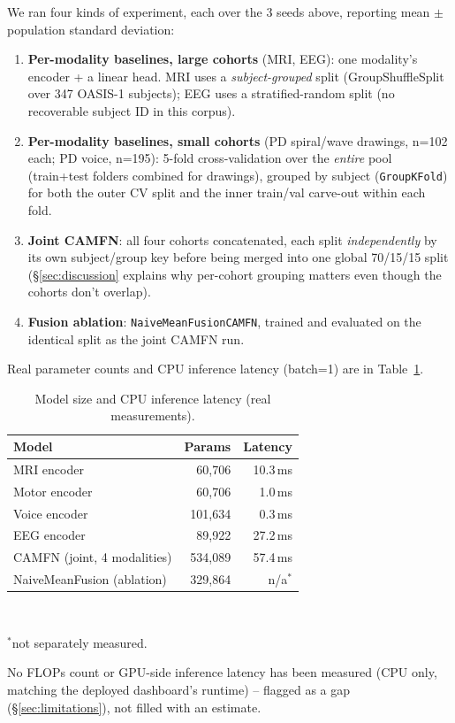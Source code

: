 \documentclass[conference]{IEEEtran}
\begin{document}
We ran four kinds of experiment, each over the 3 seeds above, reporting
mean $\pm$ population standard deviation:
\begin{enumerate}
\item \textbf{Per-modality baselines, large cohorts} (MRI, EEG): one
modality's encoder + a linear head. MRI uses a \emph{subject-grouped}
split (GroupShuffleSplit over 347 OASIS-1 subjects); EEG uses a
stratified-random split (no recoverable subject ID in this corpus).
\item \textbf{Per-modality baselines, small cohorts} (PD spiral/wave
drawings, n=102 each; PD voice, n=195): 5-fold cross-validation over the
\emph{entire} pool (train+test folders combined for drawings), grouped
by subject (\texttt{GroupKFold}) for both the outer CV split and the
inner train/val carve-out within each fold.
\item \textbf{Joint CAMFN}: all four cohorts concatenated, each split
\emph{independently} by its own subject/group key before being merged
into one global 70/15/15 split (\S\ref{sec:discussion} explains why
per-cohort grouping matters even though the cohorts don't overlap).
\item \textbf{Fusion ablation}: \texttt{NaiveMeanFusionCAMFN}, trained
and evaluated on the identical split as the joint CAMFN run.
\end{enumerate}
Real parameter counts and CPU inference latency (batch=1) are in
Table~\ref{tab:paramcount}.

\begin{table}[!t]
\centering
\caption{Model size and CPU inference latency (real measurements).}
\label{tab:paramcount}
\footnotesize
\setlength{\tabcolsep}{4pt}
\begin{tabular}{lrr}
\toprule
\textbf{Model} & \textbf{Params} & \textbf{Latency} \\
\midrule
MRI encoder & 60{,}706 & 10.3\,ms \\
Motor encoder & 60{,}706 & 1.0\,ms \\
Voice encoder & 101{,}634 & 0.3\,ms \\
EEG encoder & 89{,}922 & 27.2\,ms \\
CAMFN (joint, 4 modalities) & 534{,}089 & 57.4\,ms \\
NaiveMeanFusion (ablation) & 329{,}864 & n/a$^*$ \\
\bottomrule
\end{tabular}
\\[2pt]
\raggedright\footnotesize $^*$not separately measured.
\end{table}
No FLOPs count or GPU-side inference latency has been measured (CPU only,
matching the deployed dashboard's runtime) -- flagged as a gap
(\S\ref{sec:limitations}), not filled with an estimate.
\end{document}
